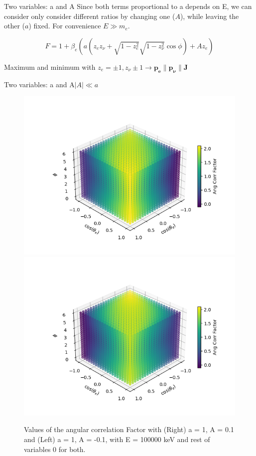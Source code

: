 \documentclass{beamer}
\begin{document}
\begin{frame}{Two variables: a and A}
	Since both terms proportional to a depends on E, we can consider only consider different ratios by changing one ($A$), while leaving the other ($a$) fixed. For convenience $E \gg m_e$.

	$$F = 1 + \beta_e(a (z_ez_\nu + \sqrt{1-z^2_e}\sqrt{1-z^2_\nu}\cos \phi) + Az_e)$$
	
	Maximum and minimum with $z_e=\pm1,z_\nu \pm1 \rightarrow \boldsymbol{p_e} \parallel \boldsymbol{p_\nu} \parallel \boldsymbol{J}$  
	
\end{frame}
\begin{frame}{Two variables: a and A}{$|A|\ll a$}
	\begin{figure}
		\centering
		\includegraphics[width=0.4\paperwidth]{plots/posa_xsposA_3D}
		\includegraphics[width=0.4\paperwidth]{plots/posa_xsnegA_3D}
		\caption{Values of the angular correlation Factor with (Right) a = 1, A = 0.1 and (Left) a = 1, A = -0.1, with E = 100000 keV and rest of variables 0 for both.}
	\end{figure}
\end{frame}
\end{document}
